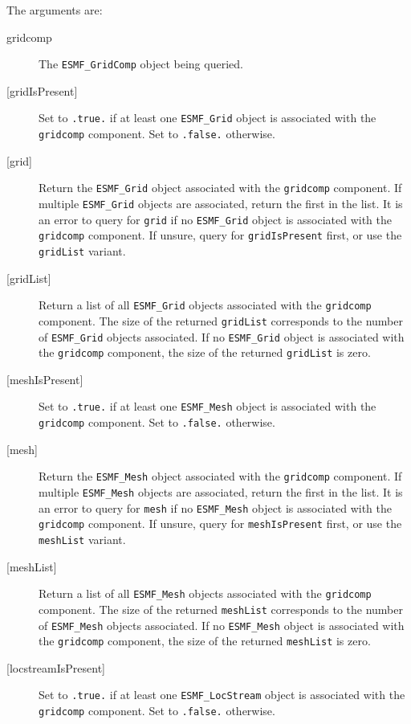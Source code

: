    The arguments are:
   \begin{description}
   \item[gridcomp]
     The {\tt ESMF\_GridComp} object being queried.
   \item[{[gridIsPresent]}]
     Set to {\tt .true.} if at least one {\tt ESMF\_Grid} object is
     associated with the {\tt gridcomp} component.
     Set to {\tt .false.} otherwise.
   \item[{[grid]}]
     Return the {\tt ESMF\_Grid} object associated with the {\tt gridcomp}
     component. If multiple {\tt ESMF\_Grid} objects are associated, return the
     first in the list.
     It is an error to query for {\tt grid} if no {\tt ESMF\_Grid} object is
     associated with the {\tt gridcomp} component.
     If unsure, query for {\tt gridIsPresent} first, or use the {\tt gridList}
     variant.
   \item[{[gridList]}]
     Return a list of all {\tt ESMF\_Grid} objects associated with the
     {\tt gridcomp} component. The size of the returned {\tt gridList}
     corresponds to the number of {\tt ESMF\_Grid} objects associated.
     If no {\tt ESMF\_Grid} object is associated with the {\tt gridcomp}
     component, the size of the returned {\tt gridList} is zero.
   \item[{[meshIsPresent]}]
     Set to {\tt .true.} if at least one {\tt ESMF\_Mesh} object is
     associated with the {\tt gridcomp} component.
     Set to {\tt .false.} otherwise.
   \item[{[mesh]}]
     Return the {\tt ESMF\_Mesh} object associated with the {\tt gridcomp}
     component. If multiple {\tt ESMF\_Mesh} objects are associated, return the
     first in the list.
     It is an error to query for {\tt mesh} if no {\tt ESMF\_Mesh} object is
     associated with the {\tt gridcomp} component.
     If unsure, query for {\tt meshIsPresent} first, or use the {\tt meshList}
     variant.
   \item[{[meshList]}]
     Return a list of all {\tt ESMF\_Mesh} objects associated with the
     {\tt gridcomp} component. The size of the returned {\tt meshList}
     corresponds to the number of {\tt ESMF\_Mesh} objects associated.
     If no {\tt ESMF\_Mesh} object is associated with the {\tt gridcomp}
     component, the size of the returned {\tt meshList} is zero.
   \item[{[locstreamIsPresent]}]
     Set to {\tt .true.} if at least one {\tt ESMF\_LocStream} object is
     associated with the {\tt gridcomp} component.
     Set to {\tt .false.} otherwise.

\end{description}
